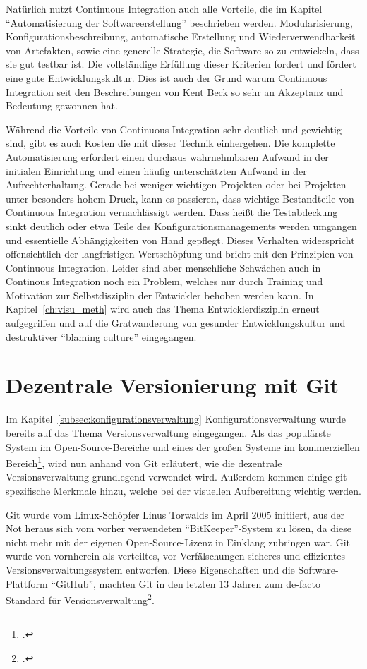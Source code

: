 Natürlich nutzt Continuous Integration auch alle Vorteile, die im Kapitel ``Automatisierung der Softwareerstellung'' beschrieben werden. Modularisierung, Konfigurationsbeschreibung, automatische Erstellung und Wiederverwendbarkeit von Artefakten, sowie eine generelle Strategie, die Software so zu entwickeln, dass sie gut testbar ist. Die vollständige Erfüllung dieser Kriterien fordert und fördert eine gute Entwicklungskultur. Dies ist auch der Grund warum Continuous Integration seit den Beschreibungen von Kent Beck so sehr an Akzeptanz und Bedeutung gewonnen hat.

Während die Vorteile von Continuous Integration sehr deutlich und gewichtig sind, gibt es auch Kosten die mit dieser Technik einhergehen. Die komplette Automatisierung erfordert einen durchaus wahrnehmbaren Aufwand in der initialen Einrichtung und einen häufig unterschätzten Aufwand in der Aufrechterhaltung. Gerade bei weniger wichtigen Projekten oder bei Projekten unter besonders hohem Druck, kann es passieren, dass wichtige Bestandteile von Continuous Integration vernachlässigt werden. Dass heißt die Testabdeckung sinkt deutlich oder etwa Teile des Konfigurationsmanagements werden umgangen und essentielle Abhängigkeiten von Hand gepflegt. Dieses Verhalten widerspricht offensichtlich der langfristigen Wertschöpfung und bricht mit den Prinzipien von Continuous Integration. Leider sind aber menschliche Schwächen auch in Continous Integration noch ein Problem, welches nur durch Training und Motivation zur Selbstdisziplin der Entwickler behoben werden kann. In Kapitel~\ref{ch:visu_meth} wird auch das Thema Entwicklerdisziplin erneut aufgegriffen und auf die Gratwanderung von gesunder Entwicklungskultur und destruktiver ``blaming culture'' eingegangen.

\section{Dezentrale Versionierung mit Git}

Im Kapitel~\ref{subsec:konfigurationsverwaltung} Konfigurationsverwaltung wurde bereits auf das Thema Versionsverwaltung eingegangen. Als das populärste System im Open-Source-Bereiche und eines der großen Systeme im kommerziellen Bereich\footcite{g2crowd2018}, wird nun anhand von Git erläutert, wie die dezentrale Versionsverwaltung grundlegend verwendet wird. Außerdem kommen einige git-spezifische Merkmale hinzu, welche bei der visuellen Aufbereitung wichtig werden.

Git wurde vom Linux-Schöpfer Linus Torwalds im April 2005 initiiert, aus der Not heraus sich vom vorher verwendeten ``BitKeeper''-System zu lösen, da diese nicht mehr mit der eigenen Open-Source-Lizenz in Einklang zubringen war. Git wurde von vornherein als verteiltes, vor Verfälschungen sicheres und effizientes Versionsverwaltungssystem entworfen. Diese Eigenschaften und die Software-Plattform ``GitHub'', machten Git in den letzten 13 Jahren zum de-facto Standard für Versionsverwaltung\footcite{heise-torvald-git2015}.

